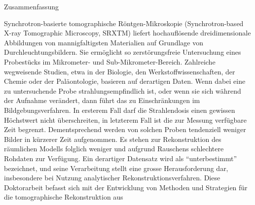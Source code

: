 {%



\clearpage

\begin{center}
	{\fontsize{20}{2}\selectfont \textcolor{darkcerulean}{Zusammenfassung}}
\end{center}	
Synchrotron-basierte tomographische R\"{o}ntgen-Mikroskopie (Synchrotron-based X-ray Tomographic Microscopy, SRXTM) liefert hochaufl\"{o}sende
dreidimensionale Abbildungen von mannigfaltigsten Materialien auf Grundlage von Durchleuchtungsbildern. Sie erm\"{o}glicht so zerst\"{o}rungsfreie
Untersuchung eines Probest\"{u}cks im Mikrometer- und Sub-Mikrometer-Bereich. Zahlreiche wegweisende Studien, etwa in der Biologie,
den Werkstoffwissenschaften, der Chemie oder der Pal\"{a}ontologie, basieren auf derartigen Daten.
\newline\newline
Wenn dabei eine zu untersuchende Probe strahlungsempfindlich ist, oder wenn sie sich w\"{a}hrend der Aufnahme ver\"{a}ndert,
dann f\"{u}hrt das zu Einschr\"{a}nkungen im Bildgebungsverfahren. In ersterem Fall darf die Strahlendosis einen gewissen H\"{o}chstwert
nicht \"{u}berschreiten, in letzterem Fall ist die zur Messung verf\"{u}gbare Zeit begrenzt. Dementsprechend werden von solchen Proben
tendenziell weniger Bilder in k\"{u}rzerer Zeit aufgenommen. Es stehen zur Rekonstruktion des r\"{a}umlichen Modells folglich weniger
und aufgrund Rauschens schlechtere Rohdaten zur Verf\"{u}gung. Ein derartiger Datensatz wird als ``unterbestimmt'' bezeichnet, und
seine Verarbeitung stellt eine grosse Herausforderung dar, insbesondere bei Nutzung analytischer Rekonstruktionsverfahren.
\newline\newline
Diese Doktorarbeit befasst sich mit der Entwicklung von Methoden und Strategien f\"{u}r die tomographische Rekonstruktion aus 
}
